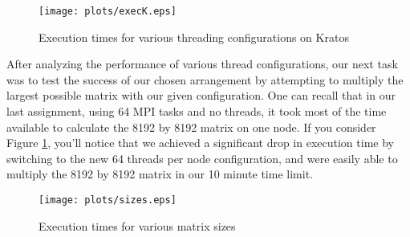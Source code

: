 \documentclass[twocolumn]{article}
\begin{document}
\begin{figure}
  \centering
  \texttt{[image: plots/execK.eps]}
  \caption{Execution times for various threading configurations on Kratos} 
\end{figure}

After analyzing the performance of various thread configurations, our next task
was to test the success of our chosen arrangement by attempting to multiply the
largest possible matrix with our given configuration. One can recall that in our
last assignment, using 64 MPI tasks and no threads, it took most of the time 
available to calculate the 8192 by 8192 matrix on one node. If you consider Figure
\ref{fig:time}, you'll notice that we achieved a significant drop in execution 
time by switching to the new 64 threads per node configuration, and were easily 
able to multiply the 8192 by 8192 matrix in our 10 minute time limit.

\begin{figure}
  \texttt{[image: plots/sizes.eps]}
  \caption{Execution times for various matrix sizes} \label{fig:time}
\end{figure}
\end{document}
